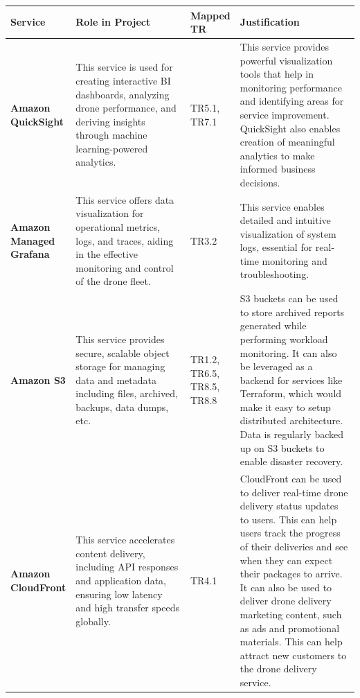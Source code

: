 \documentclass{article}
\begin{document}
\begin{table}[H]
    \centering
    \def\arraystretch{1.5}
    \begin{tabular}{|p{0.125\linewidth}| p{0.4\linewidth} | p{0.075\linewidth} | p{0.4\linewidth} |} \hline 
         \textbf{Service}&  \textbf{Role in Project}&  \textbf{Mapped TR}& \textbf{Justification}\\ \hline 
         \textbf{Amazon QuickSight \cite{quicksight}}&  This service is used for creating interactive BI dashboards, analyzing drone performance, and deriving insights through machine learning-powered analytics.&  TR5.1, TR7.1& This service provides powerful visualization tools that help in monitoring performance and identifying areas for service improvement. QuickSight also enables creation of meaningful analytics to make informed business decisions. \\ \hline 
         
         \textbf{Amazon Managed Grafana \cite{grafana}} &  This service offers data visualization for operational metrics, logs, and traces, aiding in the effective monitoring and control of the drone fleet.&  TR3.2& This service enables detailed and intuitive visualization of system logs, essential for real-time monitoring and troubleshooting.\\ \hline 
         
         \textbf{Amazon S3 \cite{s3}}&  This service provides secure, scalable object storage for managing data and metadata including files, archived, backups, data dumps, etc. & TR1.2, TR6.5, TR8.5, TR8.8& S3 buckets can be used to store archived reports generated while performing workload monitoring. It can also be leveraged as a backend for services like Terraform, which would make it easy to setup distributed architecture. Data is regularly backed up on S3 buckets to enable disaster recovery.  
         
         \\ \hline 
         
         \textbf{Amazon CloudFront \cite{cloudfront}} &  This service accelerates content delivery, including API responses and application data, ensuring low latency and high transfer speeds globally.& TR4.1 & CloudFront can be used to deliver real-time drone delivery status updates to users. This can help users track the progress of their deliveries and see when they can expect their packages to arrive. It can also be used to deliver drone delivery marketing content, such as ads and promotional materials. This can help attract new customers to the drone delivery service.
         

\end{tabular}
\end{table}
\end{document}
